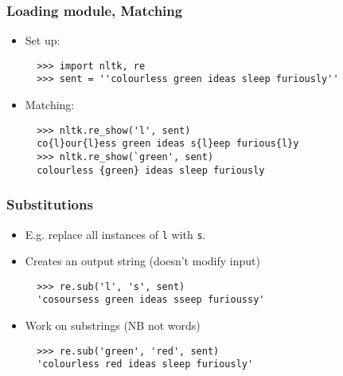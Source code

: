 \begin{frame}[fragile]\frametitle{Loading module, Matching}
\begin{itemize}
\item Set up:

{\small
\begin{lstlisting}
  >>> import nltk, re
  >>> sent = ''colourless green ideas sleep furiously''
\end{lstlisting}}

\item Matching:

{\small
\begin{lstlisting}
  >>> nltk.re_show('l', sent)
  co{l}our{l}ess green ideas s{l}eep furious{l}y
  >>> nltk.re_show(`green', sent)
  colourless {green} ideas sleep furiously
\end{lstlisting}}
\end{itemize}
\end{frame}

\begin{frame}[fragile]\frametitle{Substitutions}

\begin{itemize}
\item E.g. replace all instances of \texttt{l} with \texttt{s}.
\item Creates an output string (doesn't modify input)

\begin{lstlisting}
  >>> re.sub('l', 's', sent)
  'cosoursess green ideas sseep furioussy'
\end{lstlisting}

\item Work on substrings (NB not words)

\begin{lstlisting}
  >>> re.sub('green', 'red', sent)
  'colourless red ideas sleep furiously'
\end{lstlisting}
\end{itemize}
\end{frame}

